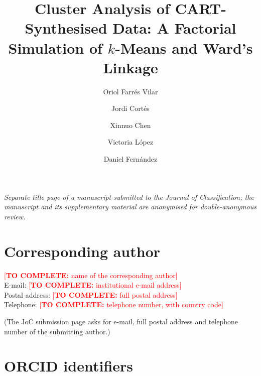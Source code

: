 \documentclass[pdflatex,referee]{sn-jnl}
\newcommand\TODO[1]{\textcolor{red}{[\textbf{TO COMPLETE:} #1]}}
\begin{document}
\title{Cluster Analysis of CART-Synthesised Data: A Factorial Simulation of
       $k$-Means and Ward's Linkage}

\author[1]{Oriol Farr\'es Vilar}
\author[2,5]{Jordi Cort\'es}
\author[3]{Xinnuo Chen}
\author[4]{Victoria L\'opez}
\author[5]{Daniel Fern\'andez}


\abstract{}


\maketitle

\noindent\emph{Separate title page of a manuscript submitted to the Journal of
Classification; the manuscript and its supplementary material are anonymised
for double-anonymous review.}

\section*{Corresponding author}

\noindent\TODO{name of the corresponding author}\\
E-mail: \TODO{institutional e-mail address}\\
Postal address: \TODO{full postal address}\\
Telephone: \TODO{telephone number, with country code}

\noindent (The JoC submission page asks for e-mail, full postal address and
telephone number of the submitting author.)

\section*{ORCID identifiers}
\end{document}
